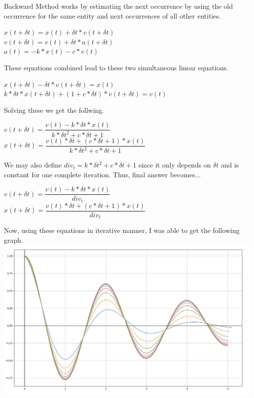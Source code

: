 \documentclass{article}
\begin{document}
        Backward Method works by estimating the next occurrence by using the old occurrence for the same entity and next occurrences of all other entities.
                \begin{center}
                \(x(t+\delta t) = x(t) + \delta t*v(t + \delta t)\) \\
                \(v(t+\delta t) = v(t) + \delta t*a(t + \delta t)\) \\
                \(a(t) = - k*x(t) - c*v(t)\) \\
                \end{center}
        These equations combined lead to these two simultaneous linear equations.
                \begin{center}
                \(x(t+\delta t) - \delta t*v(t + \delta t) = x(t)\) \\
                \(k*\delta t*x(t+\delta t) + (1+c*\delta t)*v(t+\delta t) = v(t)\) \\
                \end{center}
        Solving these we get the follwing.
                \begin{center}
                \(v(t + \delta t) = \dfrac{v(t) - k*\delta t*x(t)}{k*\delta t^2 + c*\delta t + 1}\) \\[10pt]
                \(x(t+\delta t) = \dfrac{v(t)*\delta t + (c*\delta t + 1)*x(t)}{k*\delta t^2 + c*\delta t + 1}\) \\
                \end{center}
        We may also define  \(div_t = k*\delta t^2 + c*\delta t + 1\) since it only depends on \(\delta t\) and is constant for one complete iteration. Thus, final answer becomes...
        \begin{center}
            \(v(t + \delta t) = \dfrac{v(t) - k*\delta t*x(t)}{div_t}\) \\[10pt]
                \(x(t+\delta t) = \dfrac{v(t)*\delta t + (c*\delta t + 1)*x(t)}{div_t}\) \\
        \end{center}
        {\pagebreak}
        Now, using these equations in iterative manner, I was able to get the following graph. \\
        \includegraphics[scale=.25]{../Backward.png} \\
\end{document}

